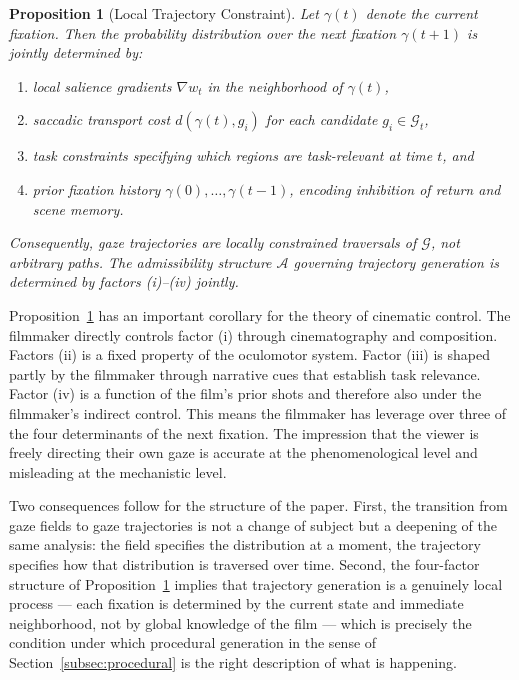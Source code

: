 \documentclass[12pt, a4paper]{article}
\theoremstyle{plain}
\newtheorem{proposition}[theorem]{Proposition}
\theoremstyle{definition}
\theoremstyle{remark}
\newcommand{\A}{\mathcal{A}}
\newcommand{\G}{\mathcal{G}}
\newcommand{\traj}{\gamma}
\newcommand{\salience}{w}
\begin{document}
\begin{proposition}[Local Trajectory Constraint]
\label{prop:local_constraint}
  Let $\traj(t)$ denote the current fixation. Then the
  probability distribution over the next fixation
  $\traj(t+1)$ is jointly determined by:
  \begin{enumerate}[label=\emph{(\roman*)}]
    \item local salience gradients $\nabla \salience_t$
      in the neighborhood of $\traj(t)$,
    \item saccadic transport cost $d(\traj(t), g_i)$
      for each candidate $g_i \in \G_t$,
    \item task constraints specifying which regions are
      task-relevant at time $t$, and
    \item prior fixation history $\traj(0), \ldots,
      \traj(t-1)$, encoding inhibition of return and
      scene memory.
  \end{enumerate}
  Consequently, gaze trajectories are locally constrained
  traversals of $\G$, not arbitrary paths. The admissibility
  structure $\A$ governing trajectory generation is
  determined by factors (i)--(iv) jointly.
\end{proposition}

Proposition~\ref{prop:local_constraint} has an important
corollary for the theory of cinematic control. The
filmmaker directly controls factor (i) through
cinematography and composition. Factors (ii) is a fixed
property of the oculomotor system. Factor (iii) is shaped
partly by the filmmaker through narrative cues that
establish task relevance. Factor (iv) is a function of the
film's prior shots and therefore also under the filmmaker's
indirect control. This means the filmmaker has leverage
over three of the four determinants of the next fixation.
The impression that the viewer is freely directing their
own gaze is accurate at the phenomenological level and
misleading at the mechanistic level.

Two consequences follow for the structure of the paper.
First, the transition from gaze fields to gaze trajectories
is not a change of subject but a deepening of the same
analysis: the field specifies the distribution at a moment,
the trajectory specifies how that distribution is traversed
over time. Second, the four-factor structure of
Proposition~\ref{prop:local_constraint} implies that
trajectory generation is a genuinely local process ---
each fixation is determined by the current state and
immediate neighborhood, not by global knowledge of the
film --- which is precisely the condition under which
procedural generation in the sense of Section~\ref{subsec:procedural}
is the right description of what is happening.
\end{document}
